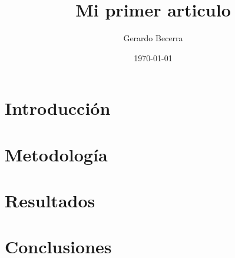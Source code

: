 \documentclass{article}
\title{Mi primer articulo}
\author{Gerardo Becerra}
\date{\today}
\begin{document}
  \maketitle

  \begin{abstract}
    \lipsum[1]
  \end{abstract}

  \section{Introducción}
  \lipsum[1-4] \cite{goodfellow2016deep}

  \section{Metodología}
  \lipsum[1-4] \cite{PIGA2021415}
  
  \section{Resultados}
  \lipsum[1-4] \cite{9372789}
  
  \section{Conclusiones}
  \lipsum[1-4]
 
  \printbibliography
\end{document}
